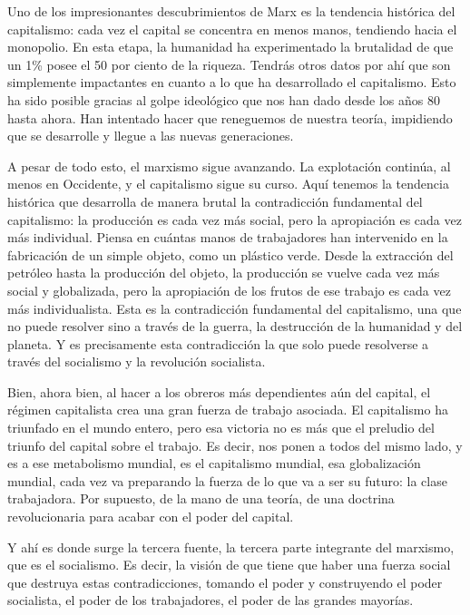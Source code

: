 \documentclass[
  jou,
  floatsintext,
  longtable,
  a4paper,
  nolmodern,
  notxfonts,
  notimes,
  colorlinks=true,linkcolor=blue,citecolor=blue,urlcolor=blue]{apa7}
\begin{document}
Uno de los impresionantes descubrimientos de Marx es la tendencia
histórica del capitalismo: cada vez el capital se concentra en menos
manos, tendiendo hacia el monopolio. En esta etapa, la humanidad ha
experimentado la brutalidad de que un 1\% posee el 50 por ciento de la
riqueza. Tendrás otros datos por ahí que son simplemente impactantes en
cuanto a lo que ha desarrollado el capitalismo. Esto ha sido posible
gracias al golpe ideológico que nos han dado desde los años 80 hasta
ahora. Han intentado hacer que reneguemos de nuestra teoría, impidiendo
que se desarrolle y llegue a las nuevas generaciones.

A pesar de todo esto, el marxismo sigue avanzando. La explotación
continúa, al menos en Occidente, y el capitalismo sigue su curso. Aquí
tenemos la tendencia histórica que desarrolla de manera brutal la
contradicción fundamental del capitalismo: la producción es cada vez más
social, pero la apropiación es cada vez más individual. Piensa en
cuántas manos de trabajadores han intervenido en la fabricación de un
simple objeto, como un plástico verde. Desde la extracción del petróleo
hasta la producción del objeto, la producción se vuelve cada vez más
social y globalizada, pero la apropiación de los frutos de ese trabajo
es cada vez más individualista. Esta es la contradicción fundamental del
capitalismo, una que no puede resolver sino a través de la guerra, la
destrucción de la humanidad y del planeta. Y es precisamente esta
contradicción la que solo puede resolverse a través del socialismo y la
revolución socialista.

Bien, ahora bien, al hacer a los obreros más dependientes aún del
capital, el régimen capitalista crea una gran fuerza de trabajo
asociada. El capitalismo ha triunfado en el mundo entero, pero esa
victoria no es más que el preludio del triunfo del capital sobre el
trabajo. Es decir, nos ponen a todos del mismo lado, y es a ese
metabolismo mundial, es el capitalismo mundial, esa globalización
mundial, cada vez va preparando la fuerza de lo que va a ser su futuro:
la clase trabajadora. Por supuesto, de la mano de una teoría, de una
doctrina revolucionaria para acabar con el poder del capital.

Y ahí es donde surge la tercera fuente, la tercera parte integrante del
marxismo, que es el socialismo. Es decir, la visión de que tiene que
haber una fuerza social que destruya estas contradicciones, tomando el
poder y construyendo el poder socialista, el poder de los trabajadores,
el poder de las grandes mayorías.
\end{document}
